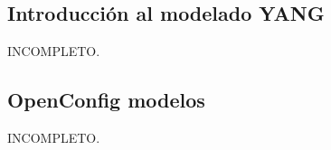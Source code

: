 

\subsection{Introducción al modelado YANG}
\Large{INCOMPLETO.}
\subsection{OpenConfig modelos}
\Large{INCOMPLETO.}